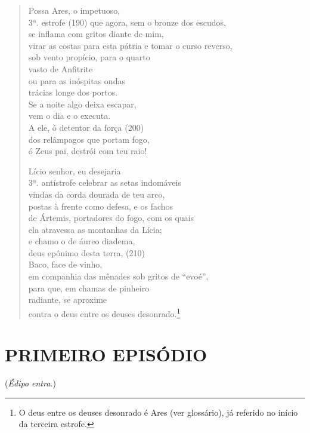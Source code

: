 \begin{verse}
Possa Ares, o impetuoso,\\ 3ª. estrofe (190)
que agora, sem o bronze dos escudos,\\
se inflama com gritos diante de mim,\\
virar as costas para esta pátria e tomar o curso reverso,\\
sob vento propício, para o quarto\\
vasto de Anfitrite\\
ou para as inóspitas ondas\\
trácias longe dos portos.\\
Se a noite algo deixa escapar,\\
vem o dia e o executa.\\
A ele, ó detentor da força (200)\\
dos relâmpagos que portam fogo,\\
ó Zeus pai, destrói com teu raio!

Lício senhor, eu desejaria\\ 3ª. antístrofe
celebrar as setas indomáveis\\
vindas da corda dourada de teu arco,\\
postas à frente como defesa, e os fachos\\
de Ártemis, portadores do fogo, com os quais\\
ela atravessa as montanhas da Lícia;\\
e chamo o de áureo diadema,\\
deus epônimo desta terra, (210)\\
Baco, face de vinho,\\
em companhia das mênades sob gritos de ``evoé'',\\
para que, em chamas de pinheiro\\
radiante, se aproxime\\
contra o deus entre os deuses desonrado.\footnote{O deus entre os deuses desonrado é Ares (ver glossário), já referido no início da terceira estrofe.}
\end{verse}

\section{PRIMEIRO EPISÓDIO}

(\emph{Édipo entra.})


